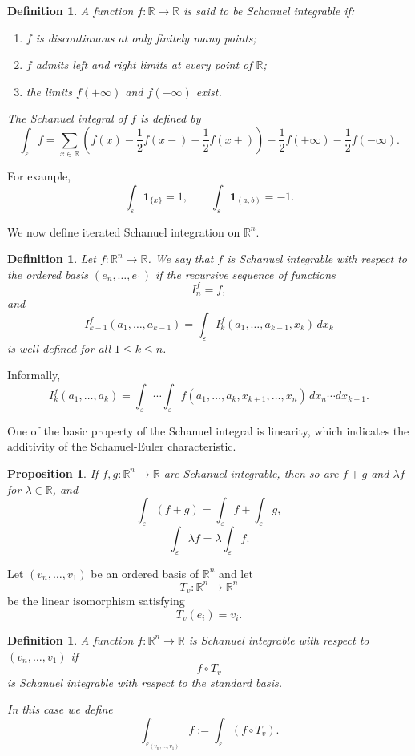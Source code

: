 \documentclass[11pt]{article}
\newtheorem{proposition}[theorem]{Proposition}
\newtheorem{definition}[theorem]{Definition}
\theoremstyle{remark}
\newcommand{\R}{\mathbb R}
\newcommand{\eps}{\varepsilon}
\newcommand{\1}{\mathbf 1}
\begin{document}
\begin{definition}
A function $f:\R\to\R$ is said to be Schanuel integrable if:

\begin{enumerate}[label=(\roman*)]
\item $f$ is discontinuous at only finitely many points;
\item $f$ admits left and right limits at every point of $\R$;
\item the limits $f(+\infty)$ and $f(-\infty)$ exist.
\end{enumerate}

\noindent The Schanuel integral of $f$ is defined by
\[
\int_\eps f
=
\sum_{x\in\R}
\left(
f(x)
-\frac12 f(x-)
-\frac12 f(x+)
\right)
-\frac12 f(+\infty)
-\frac12 f(-\infty).
\]
\end{definition}

For example,
\[
\int_\eps \mathbf 1_{\{x\}} = 1,
\qquad
\int_\eps \mathbf 1_{(a,b)} = -1.
\]

\noindent We now define iterated Schanuel integration on $\R^n$.

\begin{definition}
Let $f:\R^n\to\R$.
We say that $f$ is Schanuel integrable with respect to the ordered basis $(e_n,\dots,e_1)$ if the recursive sequence of functions
\[
I_n^f=f,
\]
and
\[
I_{k-1}^f(a_1,\dots,a_{k-1})
=
\int_\eps
I_k^f(a_1,\dots,a_{k-1},x_k)\,dx_k
\]
is well-defined for all $1\le k\le n$.
\end{definition}

\noindent Informally,
\[
I_k^f(a_1,\dots,a_k)
=
\int_\eps\cdots\int_\eps
f(a_1,\dots,a_k,x_{k+1},\dots,x_n)
\,dx_n\cdots dx_{k+1}.
\]

\noindent One of the basic property of the Schanuel integral is linearity, which indicates the additivity of the Schanuel-Euler characteristic.

\begin{proposition}
If $f,g:\R^n\to\R$ are Schanuel integrable, then so are $f+g$ and $\lambda f$ for $\lambda\in\R$, and
\[
\int_\eps (f+g)
=
\int_\eps f
+
\int_\eps g,
\]
\[
\int_\eps \lambda f
=
\lambda \int_\eps f.
\]
\end{proposition}

Let $(v_n,\dots,v_1)$ be an ordered basis of $\R^n$ and let
\[
T_v:\R^n\to\R^n
\]
be the linear isomorphism satisfying
\[
T_v(e_i)=v_i.
\]

\begin{definition}
A function $f:\R^n\to\R$ is Schanuel integrable with respect to $(v_n,\dots,v_1)$ if
\[
f\circ T_v
\]
is Schanuel integrable with respect to the standard basis.

In this case we define
\[
\int_{\eps_{(v_n,\dots,v_1)}} f
:=
\int_\eps (f\circ T_v).
\]
\end{definition}
\end{document}
